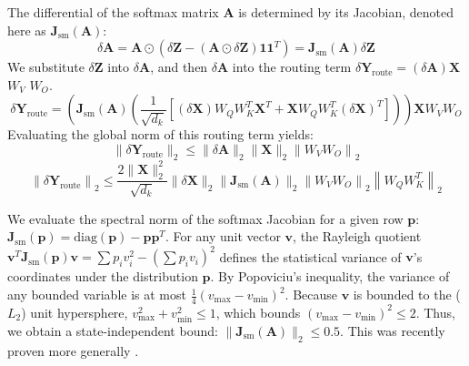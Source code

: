 \documentclass[a4paper,12pt]{article}
\begin{document}
    The differential of the softmax matrix $\mathbf{A}$ is determined by its Jacobian, denoted here as $\mathbf{J}_{\text{sm}}(\mathbf{A})$:
    \begin{equation}
        \delta \mathbf{A} = \mathbf{A} \odot \left( \delta \mathbf{Z} - (\mathbf{A} \odot \delta \mathbf{Z})\mathbf{1}\mathbf{1}^T \right) = \mathbf{J}_{\text{sm}}(\mathbf{A}) \delta \mathbf{Z}
    \end{equation}
    We substitute $\delta \mathbf{Z}$ into $\delta \mathbf{A}$, and then $\delta \mathbf{A}$ into the routing term $\delta \mathbf{Y}_{\text{route}} = (\delta \mathbf{A}) \mathbf{X}$ $W_V$ $W_O$. 
    \begin{equation} \label{eq:nonlinear_routing_full}
        \delta \mathbf{Y}_{\text{route}} = \left( \mathbf{J}_{\text{sm}}(\mathbf{A}) \left( \frac{1}{\sqrt{d_k}} \left[ (\delta \mathbf{X}) W_Q W_K^T \mathbf{X}^T + \mathbf{X} W_Q W_K^T (\delta \mathbf{X})^T \right] \right) \right) \mathbf{X} W_V W_O
    \end{equation}
    Evaluating the global norm of this routing term yields:
    \begin{equation}
        \|\delta \mathbf{Y}_{\text{route}}\|_2 \le \|\delta \mathbf{A}\|_2 \|\mathbf{X}\|_2 \left\|W_V W_O\right\|_2
    \end{equation}
    \begin{equation}
        \left\| \delta \mathbf{Y}_{\text{route}} \right\|_2 \le \frac{2 \|\mathbf{X}\|_2^2}{\sqrt{d_k}} \|\delta \mathbf{X}\|_2 \|\mathbf{J}_{\text{sm}}(\mathbf{A})\|_2 \left\|W_V W_O\right\|_2 \left\|W_Q W_K^T\right\|_2
    \end{equation}

    We evaluate the spectral norm of the softmax Jacobian for a given row $\mathbf{p}$: $\mathbf{J}_{\text{sm}}(\mathbf{p}) = \text{diag}(\mathbf{p}) - \mathbf{p} \mathbf{p}^T$. For any unit vector $\mathbf{v}$, the Rayleigh quotient $\mathbf{v}^T \mathbf{J}_{\text{sm}}(\mathbf{p}) \mathbf{v} = \sum p_i v_i^2 - (\sum p_i v_i)^2$ defines the statistical variance of $\mathbf{v}$'s coordinates under the distribution $\mathbf{p}$. By Popoviciu's inequality, the variance of any bounded variable is at most $\frac{1}{4}(v_{\max} - v_{\min})^2$. Because $\mathbf{v}$ is bounded to the ($L_2$) unit hypersphere, $v_{\max}^2 + v_{\min}^2 \le 1$, which bounds $(v_{\max} - v_{\min})^2 \le 2$. Thus, we obtain a state-independent bound: $\|\mathbf{J}_{\text{sm}}(\mathbf{A})\|_2 \le 0.5$. This was recently proven more generally \cite{nair2025softmax12lipschitztightbound}.
\end{document}
